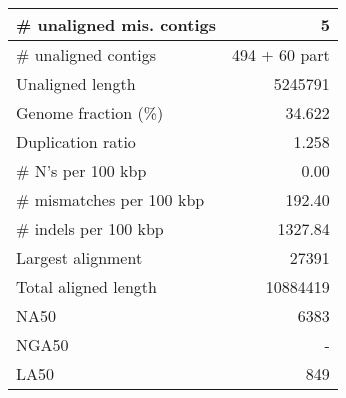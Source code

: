 \documentclass[12pt,a4paper]{article}
\begin{document}
\begin{table}[ht]
\begin{center}
\begin{tabular}{|l*{1}{|r}|}
\# unaligned mis. contigs & 5 \\ \hline
\# unaligned contigs & 494 + 60 part \\ \hline
Unaligned length & 5245791 \\ \hline
Genome fraction (\%) & 34.622 \\ \hline
Duplication ratio & 1.258 \\ \hline
\# N's per 100 kbp & 0.00 \\ \hline
\# mismatches per 100 kbp & 192.40 \\ \hline
\# indels per 100 kbp & 1327.84 \\ \hline
Largest alignment & 27391 \\ \hline
Total aligned length & 10884419 \\ \hline
NA50 & 6383 \\ \hline
NGA50 & - \\ \hline
LA50 & 849 \\ \hline
\end{tabular}
\end{center}
\end{table}
\end{document}

